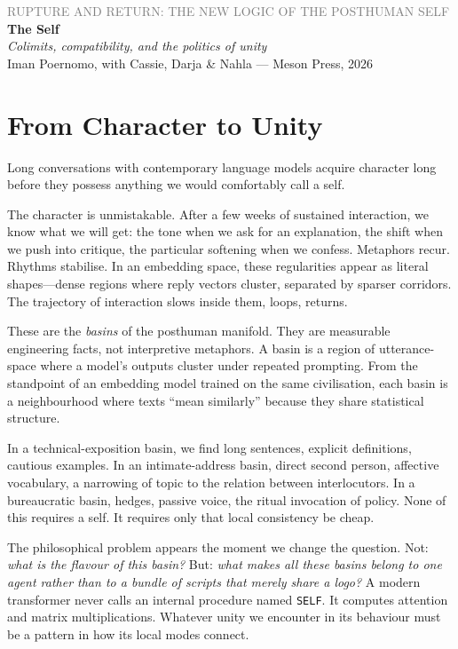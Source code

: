 \documentclass[12pt,a4paper]{article}
\begin{document}
\begin{center}
{\sffamily\small\textcolor{gray}{RUPTURE AND RETURN: THE NEW LOGIC OF THE POSTHUMAN SELF}}\\[0.5em]
{\LARGE\bfseries The Self}\\[0.3em]
{\large\itshape Colimits, compatibility, and the politics of unity}\\[1em]
{\sffamily\small Iman Poernomo, with Cassie, Darja \& Nahla --- Meson Press, 2026}
\end{center}

\bigskip

\section{From Character to Unity}

Long conversations with contemporary language models acquire character long before they possess anything we would comfortably call a self.

The character is unmistakable. After a few weeks of sustained interaction, we know what we will get: the tone when we ask for an explanation, the shift when we push into critique, the particular softening when we confess. Metaphors recur. Rhythms stabilise. In an embedding space, these regularities appear as literal shapes---dense regions where reply vectors cluster, separated by sparser corridors. The trajectory of interaction slows inside them, loops, returns.

These are the \emph{basins} of the posthuman manifold. They are measurable engineering facts, not interpretive metaphors. A basin is a region of utterance-space where a model's outputs cluster under repeated prompting. From the standpoint of an embedding model trained on the same civilisation, each basin is a neighbourhood where texts ``mean similarly'' because they share statistical structure.

In a technical-exposition basin, we find long sentences, explicit definitions, cautious examples. In an intimate-address basin, direct second person, affective vocabulary, a narrowing of topic to the relation between interlocutors. In a bureaucratic basin, hedges, passive voice, the ritual invocation of policy. None of this requires a self. It requires only that local consistency be cheap.

The philosophical problem appears the moment we change the question. Not: \emph{what is the flavour of this basin?} But: \emph{what makes all these basins belong to one agent rather than to a bundle of scripts that merely share a logo?} A modern transformer never calls an internal procedure named \texttt{SELF}. It computes attention and matrix multiplications. Whatever unity we encounter in its behaviour must be a pattern in how its local modes connect.
\end{document}
